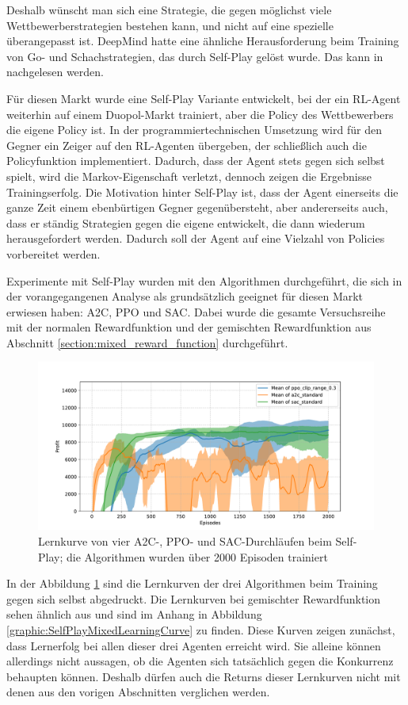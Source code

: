 Deshalb wünscht man sich eine Strategie, die gegen möglichst viele Wettbewerberstrategien bestehen kann, und nicht auf eine spezielle überangepasst ist.
DeepMind hatte eine ähnliche Herausforderung beim Training von Go- und Schachstrategien, das durch Self-Play gelöst wurde. 
Das kann in \cite{Silver2017, https://doi.org/10.48550/arxiv.1712.01815} nachgelesen werden.

Für diesen Markt wurde eine Self-Play Variante entwickelt, bei der ein RL-Agent weiterhin auf einem Duopol-Markt trainiert, aber die Policy des Wettbewerbers die eigene Policy ist.
In der programmiertechnischen Umsetzung wird für den Gegner ein Zeiger auf den RL-Agenten übergeben, der schließlich auch die Policyfunktion implementiert.
Dadurch, dass der Agent stets gegen sich selbst spielt, wird die Markov-Eigenschaft verletzt, dennoch zeigen die Ergebnisse Trainingserfolg.
Die Motivation hinter Self-Play ist, dass der Agent einerseits die ganze Zeit einem ebenbürtigen Gegner gegenübersteht, aber andererseits auch, dass er ständig Strategien gegen die eigene entwickelt, die dann wiederum herausgefordert werden.
Dadurch soll der Agent auf eine Vielzahl von Policies vorbereitet werden.

Experimente mit Self-Play wurden mit den Algorithmen durchgeführt, die sich in der vorangegangenen Analyse als grundsätzlich geeignet für diesen Markt erwiesen haben: A2C, PPO und SAC.
Dabei wurde die gesamte Versuchsreihe mit der normalen Rewardfunktion und der gemischten Rewardfunktion aus Abschnitt \ref{section:mixed_reward_function} durchgeführt.

\begin{figure}[htb]
	\centering
	\includegraphics[width=\textwidth]{main/self_play.pdf}
	\caption{Lernkurve von vier A2C-, PPO- und SAC-Durchläufen beim Self-Play; die Algorithmen wurden über 2000 Episoden trainiert}
	\label{graphic:SelfPlayLearningCurve}
\end{figure}
In der Abbildung \ref{graphic:SelfPlayLearningCurve} sind die Lernkurven der drei Algorithmen beim Training gegen sich selbst abgedruckt.
Die Lernkurven bei gemischter Rewardfunktion sehen ähnlich aus und sind im Anhang in Abbildung \ref{graphic:SelfPlayMixedLearningCurve} zu finden.
Diese Kurven zeigen zunächst, dass Lernerfolg bei allen dieser drei Agenten erreicht wird.
Sie alleine können allerdings nicht aussagen, ob die Agenten sich tatsächlich gegen die Konkurrenz behaupten können.
Deshalb dürfen auch die Returns dieser Lernkurven nicht mit denen aus den vorigen Abschnitten verglichen werden.

